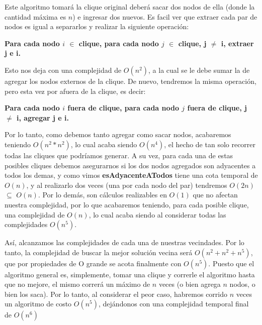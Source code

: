 Este algoritmo tomará la clique original deberá sacar dos nodos de ella (donde la cantidad máxima es $n$) e ingresar dos nuevos. Es facil ver que extraer cada par de nodos es igual a separarlos y realizar la siguiente operación:

\textbf{Para cada nodo $i$ $\in$ clique, para cada nodo $j$ $\in$ clique, j $\neq$ i, extraer j e i.}

Esto nos deja con una complejidad de $O(n^2)$, a la cual se le debe sumar la de agregar los nodos externos de la clique. De nuevo, tendremos la misma operación, pero esta vez por afuera de la clique, es decir:

\textbf{Para cada nodo $i$ fuera de clique, para cada nodo $j$ fuera de  clique, j $\neq$ i, agregar j e i.}

Por lo tanto, como debemos tanto agregar como sacar nodos, acabaremos teniendo $O(n^2 * n^2)$, lo cual acaba siendo $O(n^4)$, el hecho de tan solo recorrer todas las cliques que podríamos generar. A su vez, para cada una de estas posibles cliques debemos asegurarnos si los dos nodos agregados son adyacentes a todos los demas, y como vimos \textbf{esAdyacenteATodos} tiene una cota temporal de $O(n)$, y al realizarlo dos veces (una por cada nodo del par) tendremos $O(2n)$ $\subseteq$ $O(n)$. Por lo demás, son cálculos realizables en $O(1)$ que no afectan nuestra complejidad, por lo que acabaremos teniendo, para cada posible clique, una complejidad de $O(n)$, lo cual acaba siendo al considerar todas las complejidades $O(n^5)$.
\bigskip

Así, alcanzamos las complejidades de cada una de nuestras vecindades. Por lo tanto, la complejidad de buscar la mejor solución vecina será $O(n^2 + n^2 + n^5)$, que por propiedades de O grande se acota finalmente con $O(n^5)$. Puesto que el algoritmo general es, simplemente, tomar una clique y correrle el algoritmo hasta que no mejore, el mismo correrá un máximo de $n$ veces (o bien agrega $n$ nodos, o bien los saca). Por lo tanto, al considerar el peor caso, habremos corrido $n$ veces un algoritmo de costo $O(n^5)$, dejándonos con una complejidad temporal final de $O(n^6)$
